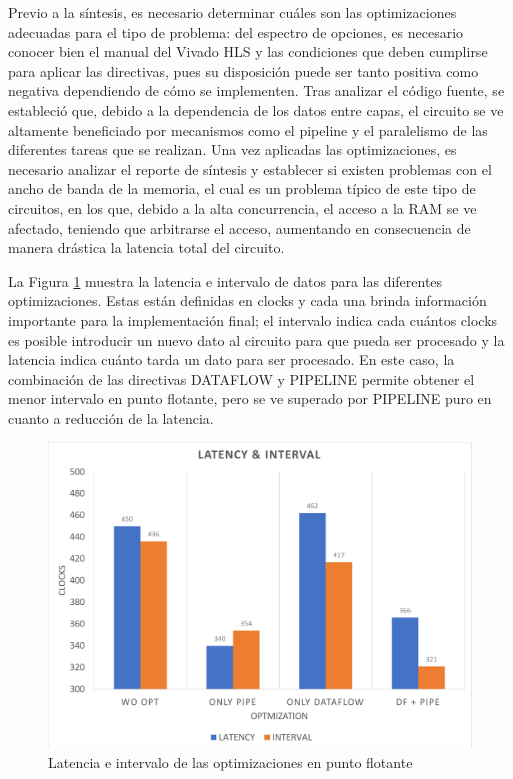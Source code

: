 Previo a la síntesis, es necesario determinar cuáles son las optimizaciones adecuadas para el tipo de problema: del espectro de opciones, es necesario conocer bien el manual del Vivado HLS y las condiciones que deben cumplirse para aplicar las directivas, pues su disposición puede ser tanto positiva como negativa dependiendo de cómo se implementen. Tras analizar el código fuente, se estableció que, debido a la dependencia de los datos entre capas, el circuito se ve altamente beneficiado por mecanismos como el pipeline y el paralelismo de las diferentes tareas que se realizan. Una vez aplicadas las optimizaciones, es necesario analizar el reporte de síntesis y establecer si existen problemas con el ancho de banda de la memoria, el cual es un problema típico de este tipo de circuitos, en los que, debido a la alta concurrencia, el acceso a la RAM se ve afectado, teniendo que arbitrarse el acceso, aumentando en consecuencia de manera drástica la latencia total del circuito.

La Figura \ref{fig:latIntFloat} muestra la latencia e intervalo de datos para las diferentes optimizaciones. Estas están definidas en clocks y cada una brinda información importante para la implementación final; el intervalo indica cada cuántos clocks es posible introducir un nuevo dato al circuito para que pueda ser procesado y la latencia indica cuánto tarda un dato para ser procesado. En este caso, la combinación de las directivas DATAFLOW y PIPELINE permite obtener el menor intervalo en punto flotante, pero se ve superado por PIPELINE puro en cuanto a reducción de la latencia.

\begin{figure}[!ht]
	\centering
		\includegraphics[scale=0.45]{Figures/LATINTFLOAT}
	\caption{Latencia e intervalo de las optimizaciones en punto flotante}
	\label{fig:latIntFloat}
\end{figure}

